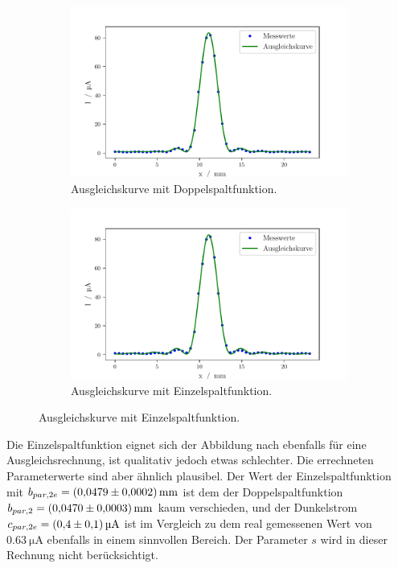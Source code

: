\begin{figure}
    \centering
    \begin{subfigure}{.5\textwidth}
      \centering
      \includegraphics[width=.7\textwidth]{python/DoppelspaltFit.pdf}
      \caption{Ausgleichskurve mit Doppelspaltfunktion.}
    \end{subfigure}%
    \begin{subfigure}{.5\textwidth}
        \centering
      \includegraphics[width=.7\linewidth]{python/DoppelspaltFitEinzel.pdf}
      \caption{Ausgleichskurve mit Einzelspaltfunktion.}
    \end{subfigure}
    \label{fig:doppeleinzel}
\end{figure}

Die Einzelspaltfunktion eignet sich der Abbildung nach ebenfalls für eine Ausgleichsrechnung, ist qualitativ jedoch etwas schlechter.
Die errechneten Parameterwerte sind aber ähnlich plausibel. Der Wert der Einzelspaltfunktion mit $b_{par, 2e} = \SI{0.0479 \pm 0.0002}{\milli\meter}$ ist dem der Doppelspaltfunktion $b_{par, 2} = \SI{0.0470 \pm 0.0003}{\milli\meter}$ kaum verschieden,
und der Dunkelstrom $c_{par, 2e} = \SI{0.4 \pm 0.1}{\micro\ampere}$ ist im Vergleich zu dem real gemessenen Wert von $\SI{0.63}{\micro\ampere}$ ebenfalls in einem sinnvollen Bereich.
Der Parameter $s$ wird in dieser Rechnung nicht berücksichtigt.

